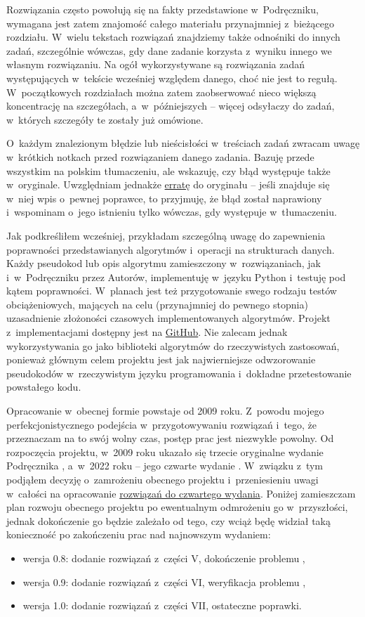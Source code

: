Rozwiązania często powołują się na fakty przedstawione w~Podręczniku, wymagana jest zatem znajomość całego materiału przynajmniej z~bieżącego rozdziału.
W~wielu tekstach rozwiązań znajdziemy także odnośniki do innych zadań, szczególnie wówczas, gdy dane zadanie korzysta z~wyniku innego we własnym rozwiązaniu.
Na ogół wykorzystywane są rozwiązania zadań występujących w~tekście wcześniej względem danego, choć nie jest to regułą.
W~początkowych rozdziałach można zatem zaobserwować nieco większą koncentrację na szczegółach, a~w~późniejszych -- więcej odsyłaczy do zadań, w~których szczegóły te zostały już omówione.

O~każdym znalezionym błędzie lub nieścisłości w~treściach zadań zwracam uwagę w~krótkich notkach przed rozwiązaniem danego zadania.
Bazuję przede wszystkim na polskim tłumaczeniu, ale wskazuję, czy błąd występuje także w~oryginale.
Uwzględniam jednakże \href{http://www.cs.dartmouth.edu/~thc/clrs-2e-bugs/bugs.php}{erratę} do oryginału -- jeśli znajduje się w~niej wpis o~pewnej poprawce, to przyjmuję, że błąd został naprawiony i~wspominam o~jego istnieniu tylko wówczas, gdy występuje w~tłumaczeniu.

Jak podkreśliłem wcześniej, przykładam szczególną uwagę do zapewnienia poprawności przedstawianych algorytmów i~operacji na strukturach danych.
Każdy pseudokod lub opis algorytmu zamieszczony w~rozwiązaniach, jak i~w~Podręczniku przez Autorów, implementuję w~języku Python i~testuję pod kątem poprawności.
W~planach jest też przygotowanie swego rodzaju testów obciążeniowych, mających na celu (przynajmniej do pewnego stopnia) uzasadnienie złożoności czasowych implementowanych algorytmów.
Projekt z~implementacjami dostępny jest na \href{https://github.com/wojtask/CormenPy}{GitHub}.
Nie zalecam jednak wykorzystywania go jako biblioteki algorytmów do rzeczywistych zastosowań, ponieważ głównym celem projektu jest jak najwierniejsze odwzorowanie pseudokodów w~rzeczywistym języku programowania i~dokładne przetestowanie powstałego kodu.

Opracowanie w~obecnej formie powstaje od 2009 roku.
Z~powodu mojego perfekcjonistycznego podejścia w~przygotowywaniu rozwiązań i~tego, że przeznaczam na to swój wolny czas, postęp prac jest niezwykle powolny.
Od rozpoczęcia projektu, w~2009 roku ukazało się trzecie oryginalne wydanie Podręcznika \cite{clrs3}, a~w~2022 roku -- jego czwarte wydanie \cite{clrs4}.
W~związku z~tym podjąłem decyzję o~zamrożeniu obecnego projektu i~przeniesieniu uwagi w~całości na opracowanie \href{https://github.com/wojtask/clrs4e-solutions}{rozwiązań do czwartego wydania}.
Poniżej zamieszczam plan rozwoju obecnego projektu po ewentualnym odmrożeniu go w~przyszłości, jednak dokończenie go będzie zależało od tego, czy wciąż będę widział taką konieczność po zakończeniu prac nad najnowszym wydaniem:
\begin{itemize}
    \item wersja 0.8: dodanie rozwiązań z~części V, dokończenie problemu ,
    \item wersja 0.9: dodanie rozwiązań z~części VI, weryfikacja problemu ,
    \item wersja 1.0: dodanie rozwiązań z~części VII, ostateczne poprawki.
\end{itemize}

